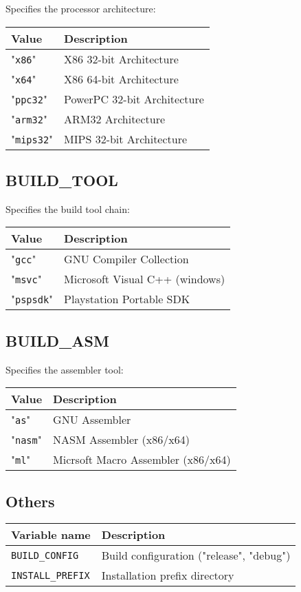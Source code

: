 \documentclass{article}
\newcommand{\var}[1]{{\tt #1}}
\newcommand{\val}[1]{"{\tt #1}"}
\begin{document}
Specifies the processor architecture:

\begin{tabular}{ll}
Value        & Description                 \\
\hline
\val{x86}    & X86 32-bit Architecture     \\
\val{x64}    & X86 64-bit Architecture     \\
\val{ppc32}  & PowerPC 32-bit Architecture \\
\val{arm32}  & ARM32 Architecture          \\
\val{mips32} & MIPS 32-bit Architecture    \\
\end{tabular}

\subsection{BUILD\_TOOL}

Specifies the build tool chain:

\begin{tabular}{ll}
Value      & Description             \\
\hline
\val{gcc}  & GNU Compiler Collection \\
\val{msvc} & Microsoft Visual C++ (windows) \\
\val{pspsdk} & Playstation Portable SDK \\
\end{tabular}

\subsection{BUILD\_ASM}

Specifies the assembler tool:

\begin{tabular}{ll}
Value      & Description              \\
\hline
\val{as}   & GNU Assembler            \\
\val{nasm} & NASM Assembler (x86/x64) \\
\val{ml}   & Micrsoft Macro Assembler (x86/x64)\\
\end{tabular}

\subsection{Others}

\begin{tabular}{ll}
Variable name		& Description		\\
\hline
\var{BUILD\_CONFIG}	& Build configuration ("release", "debug") \\
\var{INSTALL\_PREFIX}	& Installation prefix directory \\
\end{tabular}
\end{document}
